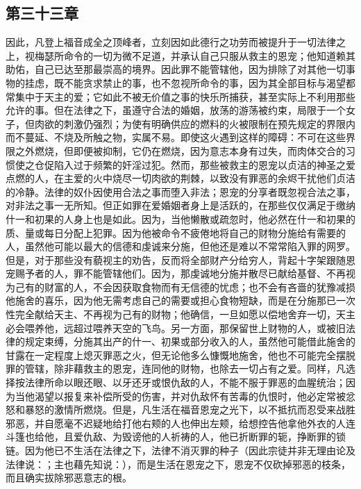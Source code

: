 \subsection{第三十三章}

\par

因此，凡登上福音成全之顶峰者，立刻因如此德行之功劳而被提升于一切法律之上，视梅瑟所命令的一切为微不足道，并承认自己只服从救主的恩宠；他知道赖其助佑，自己已达至那最崇高的境界。因此罪不能管辖他，因为排除了对其他一切事物的挂虑，既不能贪求禁止的事，也不忽视所命令的事，因为其全部目标与渴望都常集中于天主的爱；它如此不被无价值之事的快乐所捕获，甚至实际上不利用那些允许的事。但在法律之下，虽遵守合法的婚姻，放荡的游荡被约束，局限于一个女子，但肉欲的刺激仍强烈；为使有明确供应的燃料的火被限制在预先规定的界限内而不蔓延、不烧及所触之物，实属不易。即使这火遇到这样的障碍：不可在这些界限之外燃烧，但即便被抑制，它仍在燃烧，因为意志本身有过失，而肉体交合的习惯使之仓促陷入过于频繁的奸淫过犯。然而，那些被救主的恩宠以贞洁的神圣之爱点燃的人，在主爱的火中烧尽一切肉欲的荆棘，以致没有罪恶的余烬干扰他们贞洁的冷静。法律的奴仆因使用合法之事而堕入非法；恩宠的分享者既忽视合法之事，对非法之事一无所知。但正如罪在爱婚姻者身上是活跃的，在那些仅仅满足于缴纳什一和初果的人身上也是如此。因为，当他懒散或疏忽时，他必然在什一和初果的质、量或每日分配上犯罪。因为他被命令不疲倦地将自己的财物分施给有需要的人，虽然他可能以最大的信德和虔诚来分施，但他还是难以不常常陷入罪的网罗。但是，对于那些没有藐视主的劝告，反而将全部财产分给穷人，背起十字架跟随恩宠赐予者的人，罪不能管辖他们。因为，那虔诚地分施并散尽已献给基督、不再视为己有的财富的人，不会因获取食物而有无信德的忧虑；也不会有吝啬的犹豫减损他施舍的喜乐，因为他无需考虑自己的需要或担心食物短缺，而是在分施那已一次性完全献给天主、不再视为己有的财物；他确信，一旦如愿以偿地舍弃一切，天主必会喂养他，远超过喂养天空的飞鸟。另一方面，那保留世上财物的人，或被旧法律的规定束缚，分施其出产的什一、初果或部分收入的人，虽然他可能借此施舍的甘露在一定程度上熄灭罪恶之火，但无论他多么慷慨地施舍，他也不可能完全摆脱罪的管辖，除非藉救主的恩宠，连同他的财物，也除去一切占有之爱。同样，凡选择按法律所命以眼还眼、以牙还牙或恨仇敌的人，不能不服于罪恶的血腥统治；因为当他渴望以报复来补偿所受的伤害，并对仇敌怀有苦毒的仇恨时，他必定常被忿怒和暴怒的激情所燃烧。但是，凡生活在福音恩宠之光下，以不抵抗而忍受来战胜邪恶，并自愿毫不迟疑地给打他右颊的人也伸出左颊，给想控告他拿他外衣的人连斗篷也给他，且爱仇敌、为毁谤他的人祈祷的人，他已折断罪的轭，挣断罪的锁链。因为他已不生活在法律之下，法律不消灭罪的种子（因此宗徒并非无理由论及法律说：；主也藉先知说：），而是生活在恩宠之下，恩宠不仅砍掉邪恶的枝条，而且确实拔除邪恶意志的根。\par

